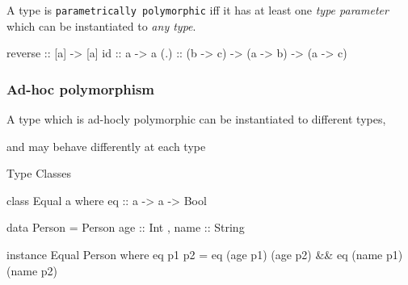 \documentclass[usenames,dvipsnames,svgnames,table,aspectratio=169,mathserif]{beamer}
\newcommand{\nl}{\vspace{\baselineskip}}
\newcommand{\pnl}{\pause \nl}
\begin{document}
\begin{frame}[fragile]


A type is {\tt parametrically polymorphic} iff it has at least one {\it type parameter}
which can be instantiated to {\it any type}.




\begin{haskellcode}
reverse :: [a] -> [a]
id :: a -> a
(.) :: (b -> c) -> (a -> b) -> (a -> c)
\end{haskellcode}

\end{frame}


\begin{frame}[fragile]
\frametitle{Ad-hoc polymorphism}

A type which is ad-hocly polymorphic can be instantiated to different types,

and may behave differently at each type

\end{frame}



\begin{frame}
\begin{center}
\huge{Type Classes}
\end{center}
\end{frame}


\begin{frame}[fragile]
\begin{haskellcode}
class Equal a where
  eq :: a -> a -> Bool
\end{haskellcode}

\pnl

\begin{haskellcode}
data Person = Person {
  age :: Int
, name :: String
}
\end{haskellcode}

\pnl

\begin{haskellcode}
instance Equal Person where
  eq p1 p2 = eq (age p1) (age p2) && eq (name p1) (name p2)
\end{haskellcode}

\end{frame}
\end{document}
